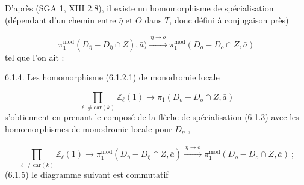D'après (SGA 1, XIII 2.8), il existe un homomorphisme de spécialisation (dépendant d'un chemin entre $\bar{\eta}$ et $O$ dans $T$, donc défini à conjugaison près)

\begin{equation}\tag{6.1.3}
\pi_1^{\mathrm{mod}}(D_{\bar{\eta}} - D_{\bar{\eta}} \cap Z), \bar{a}) \xrightarrow{\ \bar{\eta} \longrightarrow o\ } \pi_1^{\mathrm{mod}}(D_o - D_o \cap Z, \bar{a})
\end{equation}
tel que l'on ait :

6.1.4. Les homomorphisme (6.1.2.1) de monodromie locale

\begin{equation*}
\prod_{\ell \neq \mathrm{car}(k)} \mathbb{Z}_{\ell}(1) \longrightarrow \pi_1(D_o - D_o \cap Z, \bar{a})
\end{equation*}
s'obtiennent en prenant le composé de la flèche de spécialisation (6.1.3) avec les homomorphismes de monodromie locale pour $D_{\bar{\eta}}$ ,

\begin{equation}\tag{6.1.4.1}
\prod_{\ell \neq \mathrm{car}(k)} \mathbb{Z}_{\ell}(1) \longrightarrow \pi_1^{\mathrm{mod}}(D_{\bar{\eta}} - D_{\bar{\eta}} \cap Z, \bar{a}) \xrightarrow{\ \bar{\eta} \longrightarrow o\ } \pi_1^{\mathrm{mod}}(D_o - D_o \cap Z, \bar{a}) \ ;
\end{equation}
(6.1.5) le diagramme suivant est commutatif

